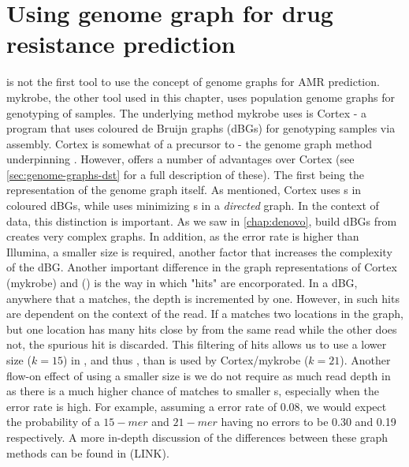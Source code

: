 
\section{Using genome graph for drug resistance prediction}
\label{sec:genome-graphs-dst}

\drprg{} is not the first tool to use the concept of genome graphs for AMR prediction. mykrobe, the other tool used in this chapter, uses population genome graphs for genotyping of samples. The underlying method mykrobe uses is Cortex \cite{iqbal2012} - a program that uses coloured de Bruijn graphs (dBGs) for genotyping samples via \denovo{} assembly. Cortex is somewhat of a precursor to \pandora{} - the genome graph method underpinning \drprg{}. However, \pandora{} offers a number of advantages over Cortex (see \autoref{sec:genome-graphs-dst} for a full description of these). The first being the representation of the genome graph itself. As mentioned, Cortex uses \kmer{}s in coloured dBGs, while \pandora{} uses minimizing \kmer{}s in a \emph{directed} graph. In the context of \ont{} data, this distinction is important. As we saw in \autoref{chap:denovo}, build dBGs from \ont{} creates very complex graphs. In addition, as the \ont{} error rate is higher than Illumina, a smaller \kmer{} size is required, another factor that increases the complexity of the dBG. Another important difference in the graph representations of Cortex (mykrobe) and \pandora{} (\drprg{}) is the way in which \kmer{} "hits" are encorporated. In a dBG, anywhere that a \kmer{} matches, the depth is incremented by one. However, in \pandora{} such hits are dependent on the context of the read. If a \kmer{} matches two locations in the graph, but one location has many hits close by from the same read while the other does not, the spurious hit is discarded. This filtering of \kmer{} hits allows us to use a lower \kmer{} size ($k=15$) in \pandora{}, and thus \drprg{}, than is used by Cortex/mykrobe ($k=21$). Another flow-on effect of using a smaller \kmer{} size is we do not require as much read depth in \drprg{} as there is a much higher chance of matches to smaller \kmer{}s, especially when the error rate is high. For example, assuming a \ont{} error rate of 0.08, we would expect the probability of a $15-mer$ and $21-mer$ having no errors to be 0.30 and 0.19 respectively. A more in-depth discussion of the differences between these graph methods can be found in (LINK).

